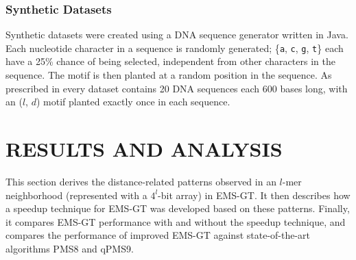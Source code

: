 \documentclass[oneside,12pt]{DISCSthesis}
\begin{document}
{	\subsection{Synthetic Datasets}
		Synthetic datasets were created using a DNA sequence generator written in Java. Each nucleotide character in a sequence is randomly generated; \{\texttt{a}, \texttt{c}, \texttt{g}, \texttt{t}\} each have a 25\% chance of being selected, independent from other characters in the sequence.
		The motif is then planted at a random position in the sequence. As prescribed in \cite{pevzner2000combinatorial} every dataset contains 20 DNA sequences each 600 bases long, with an ($l$, $d$) motif planted exactly once in each sequence.

\chapter{RESULTS AND ANALYSIS}
	This section derives the distance-related patterns observed in an $l$-mer neighborhood (represented with a $4^l$-bit array) in EMS-GT. It then describes how a speedup technique for EMS-GT was developed based on these patterns. Finally, it compares EMS-GT performance with and without the speedup technique, and compares the performance of improved EMS-GT against state-of-the-art algorithms PMS8 and qPMS9.

}
\end{document}
